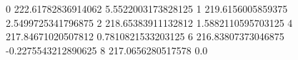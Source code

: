 0 222.61782836914062 5.5522003173828125
1 219.6156005859375 2.5499725341796875
2 218.65383911132812 1.5882110595703125
4 217.84671020507812 0.7810821533203125
6 216.83807373046875 -0.2275543212890625
8 217.0656280517578 0.0
